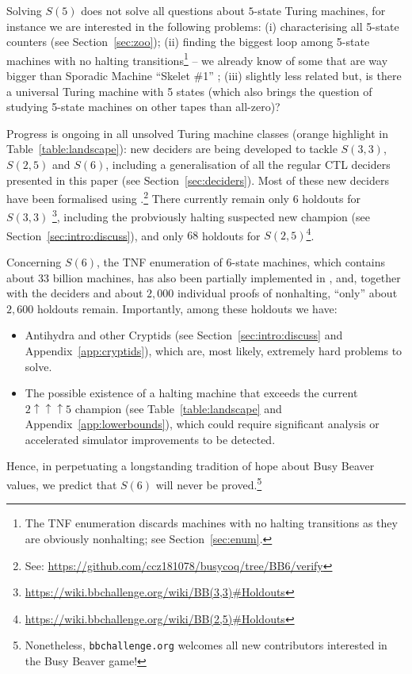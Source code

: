 \documentclass[a4paper,british]{article}
\theoremstyle{definition} %
\numberwithin{equation}{section}
\theoremstyle{definition} %
\newcommand{\numBBsholdouts}{2{,}600}
\begin{document}
Solving $S(5)$ does not solve all questions about $5$-state Turing machines, for instance we are interested in the following problems: (i) characterising all 5-state counters (see Section~\ref{sec:zoo}); (ii) finding the biggest loop among 5-state machines with no halting transitions\footnote{The TNF enumeration discards machines with no halting transitions as they are obviously nonhalting; see Section~\ref{sec:enum}.} -- we already know of some that are way bigger than Sporadic Machine ``Skelet \#1'' \cite{ligocki2022motherofgiants}; (iii) slightly less related but, is there a universal Turing machine with 5 states (which also brings the question of studying 5-state machines on other tapes than all-zero)?

Progress is ongoing in all unsolved Turing machine classes (orange highlight in Table~\ref{table:landscape}): new deciders are being developed to tackle $S(3,3)$, $S(2,5)$ and $S(6)$, including a generalisation of all the regular CTL deciders presented in this paper (see Section~\ref{sec:deciders}). Most of these new deciders have been formalised using \Coq.\footnote{See: \url{https://github.com/ccz181078/busycoq/tree/BB6/verify}} There currently remain only $6$ holdouts for $S(3,3)$ \footnote{\url{https://wiki.bbchallenge.org/wiki/BB(3,3)\#Holdouts}}, including the probviously halting suspected new champion (see Section~\ref{sec:intro:discuss}), and only $68$ holdouts for $S(2,5)$\footnote{\url{https://wiki.bbchallenge.org/wiki/BB(2,5)\#Holdouts}}.

Concerning $S(6)$, the TNF enumeration of 6-state machines, which contains about 33 billion machines, has also been partially implemented in \Coq, and, together with the deciders and about $2{,}000$ individual proofs of nonhalting, ``only'' about $\numBBsholdouts$ holdouts remain. Importantly, among these holdouts we have:
\begin{itemize}[label=--]
    \item Antihydra and other Cryptids (see Section~\ref{sec:intro:discuss} and Appendix~\ref{app:cryptids}), which are, most likely, extremely hard problems to solve.
    \item The possible existence of a halting machine that exceeds the current $2\uparrow\uparrow\uparrow5$ champion (see Table~\ref{table:landscape} and Appendix~\ref{app:lowerbounds}), which could require significant analysis or accelerated simulator improvements to be detected.
\end{itemize}


Hence, in perpetuating a longstanding tradition of hope about Busy Beaver values, we predict that $S(6)$ will never be proved.\footnote{Nonetheless, \texttt{bbchallenge.org} welcomes all new contributors interested in the Busy Beaver game!}
\end{document}
